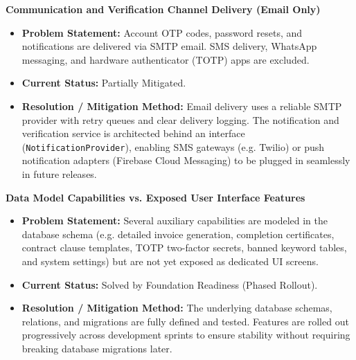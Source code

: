 \begin{description}[leftmargin=2.0cm,labelwidth=1.8cm,align=left,font=\normalfont\bfseries]
\item[LI-10] \textbf{Communication and Verification Channel Delivery (Email Only)}
\begin{itemize}[leftmargin=0.5cm, label=--]
\item \textbf{Problem Statement:} Account OTP codes, password resets, and notifications are delivered via SMTP email. SMS delivery, WhatsApp messaging, and hardware authenticator (TOTP) apps are excluded.
\item \textbf{Current Status:} Partially Mitigated.
\item \textbf{Resolution / Mitigation Method:} Email delivery uses a reliable SMTP provider with retry queues and clear delivery logging. The notification and verification service is architected behind an interface (\texttt{NotificationProvider}), enabling SMS gateways (e.g. Twilio) or push notification adapters (Firebase Cloud Messaging) to be plugged in seamlessly in future releases.
\end{itemize}

\item[LI-11] \textbf{Data Model Capabilities vs. Exposed User Interface Features}
\begin{itemize}[leftmargin=0.5cm, label=--]
\item \textbf{Problem Statement:} Several auxiliary capabilities are modeled in the database schema (e.g. detailed invoice generation, completion certificates, contract clause templates, TOTP two-factor secrets, banned keyword tables, and system settings) but are not yet exposed as dedicated UI screens.
\item \textbf{Current Status:} Solved by Foundation Readiness (Phased Rollout).
\item \textbf{Resolution / Mitigation Method:} The underlying database schemas, relations, and migrations are fully defined and tested. Features are rolled out progressively across development sprints to ensure stability without requiring breaking database migrations later.
\end{itemize}


\end{description}
